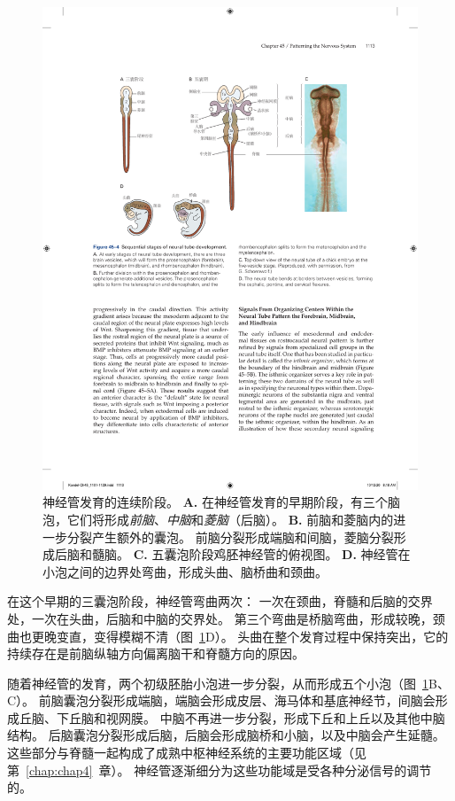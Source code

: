 \begin{figure}[htbp]
	\centering
	\includegraphics[width=1.0\linewidth]{chap45/fig_45_4}
	\caption{神经管发育的连续阶段。
		\textbf{A.} 在神经管发育的早期阶段，有三个脑泡，它们将形成\textit{前脑}、\textit{中脑}和\textit{菱脑}（后脑）。
		\textbf{B.} 前脑和菱脑内的进一步分裂产生额外的囊泡。
		前脑分裂形成端脑和间脑，菱脑分裂形成后脑和髓脑。
		\textbf{C.} 五囊泡阶段鸡胚神经管的俯视图。
		\textbf{D.} 神经管在小泡之间的边界处弯曲，形成头曲、脑桥曲和颈曲。}
	\label{fig:45_4}
\end{figure}


在这个早期的三囊泡阶段，神经管弯曲两次：
一次在颈曲，脊髓和后脑的交界处，一次在头曲，后脑和中脑的交界处。
第三个弯曲是桥脑弯曲，形成较晚，颈曲也更晚变直，变得模糊不清（图~\ref{fig:45_4}D）。
头曲在整个发育过程中保持突出，它的持续存在是前脑纵轴方向偏离脑干和脊髓方向的原因。


随着神经管的发育，两个初级胚胎小泡进一步分裂，从而形成五个小泡（图~\ref{fig:45_4}B、C）。
前脑囊泡分裂形成端脑，端脑会形成皮层、海马体和基底神经节，间脑会形成丘脑、下丘脑和视网膜。
中脑不再进一步分裂，形成下丘和上丘以及其他中脑结构。
后脑囊泡分裂形成后脑，后脑会形成脑桥和小脑，以及中脑会产生延髓。
这些部分与脊髓一起构成了成熟中枢神经系统的主要功能区域（见第~\ref{chap:chap4}~章）。
神经管逐渐细分为这些功能域是受各种分泌信号的调节的。




